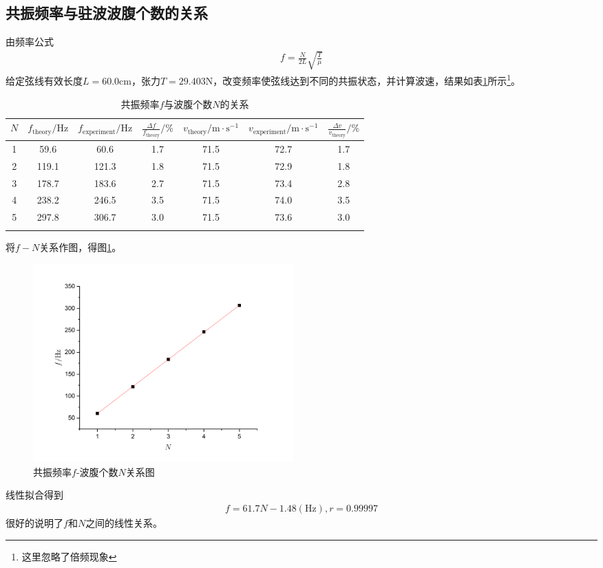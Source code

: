 \documentclass{ctexart}
\begin{document}
	\subsection{共振频率与驻波波腹个数的关系}
	由频率公式
	\begin{align}
		f=\frac{N}{2L}\sqrt{\frac{T}{\mu}}
	\end{align}
	给定弦线有效长度$L=60.0\mathrm{cm}$，张力$T=29.403\mathrm{N}$，改变频率使弦线达到不同的共振状态，并计算波速，结果如表\ref{tab:f-N}所示\footnote{这里忽略了倍频现象}。
	\begin{table}[H]
		\begin{center}
			\caption{共振频率$f$与波腹个数$N$的关系}
			\begin{tabular}{ccccccc}
				\toprule
				$N$&$f_\text{theory}/\mathrm{Hz}$&$f_\text{experiment}/\mathrm{Hz}$&$\frac{\Delta f}{f_\text{theory}}/\%$&$v_\text{theory}/\mathrm{m\cdot s^{-1}}$&$v_\text{experiment}/\mathrm{m\cdot s^{-1}}$&$\frac{\Delta v}{v_\text{theory}}/\%$\\
				\midrule
				1&59.6&60.6&1.7&71.5&72.7&1.7\\
				2&119.1&121.3&1.8&71.5&72.9&1.8\\
				3&178.7&183.6&2.7&71.5&73.4&2.8\\
				4&238.2&246.5&3.5&71.5&74.0&3.5\\
				5&297.8&306.7&3.0&71.5&73.6&3.0\\
				\bottomrule
				\label{tab:f-N}
			\end{tabular}
		\end{center}
	\end{table}
	将$f-N$关系作图，得图\ref{fig:f-N}。
	\begin{figure}[H]
		\centering
		\includegraphics[width=10cm]{fN.png}
		\caption{共振频率$f$-波腹个数$N$关系图}
		\label{fig:f-N}
	\end{figure}
	线性拟合得到
	\begin{align}
		f=61.7N-1.48(\mathrm{Hz}), r=0.99997
	\end{align}
	很好的说明了$f$和$N$之间的线性关系。
\end{document}
